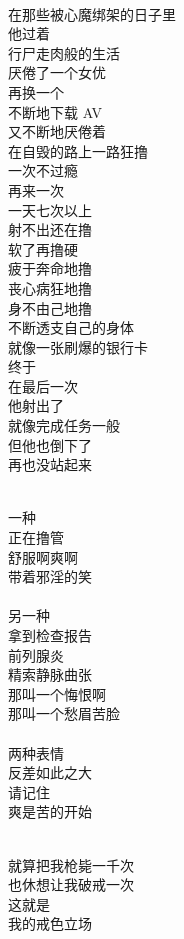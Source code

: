 \begin{poem}[手淫到天亮]
    \begin{multicols}{3}
        \begin{center}~\\
            在那些被心魔绑架的日子里 \\ 他过着 \\ 行尸走肉般的生活 \\ 厌倦了一个女优 \\ 再换一个 \\ 不断地下载 AV \\ 又不断地厌倦着 \\ 在自毁的路上一路狂撸 \\ 一次不过瘾 \\ 再来一次 \\ 一天七次以上 \\ 射不出还在撸 \\ 软了再撸硬 \\ 疲于奔命地撸 \\ 丧心病狂地撸 \\ 身不由己地撸 \\ 不断透支自己的身体 \\ 就像一张刷爆的银行卡 \\ 终于 \\ 在最后一次 \\ 他射出了 \\ 就像完成任务一般 \\ 但他也倒下了 \\ 再也没站起来
        \end{center}
    \end{multicols}
\end{poem}

\begin{poem}[两种表情]
    \begin{multicols}{3}
        \begin{center}~\\
            一种 \\ 正在撸管 \\ 舒服啊爽啊 \\ 带着邪淫的笑 \\~\\
            另一种 \\ 拿到检查报告 \\ 前列腺炎 \\ 精索静脉曲张 \\ 那叫一个悔恨啊 \\ 那叫一个愁眉苦脸 \\~\\
            两种表情 \\ 反差如此之大 \\ 请记住 \\ 爽是苦的开始
        \end{center}
    \end{multicols}
\end{poem}

\begin{poem}[立场]
    \begin{multicols}{3}
        \begin{center}~\\
            就算把我枪毙一千次 \\ 也休想让我破戒一次 \\ 这就是 \\ 我的戒色立场
        \end{center}
    \end{multicols}
\end{poem}
